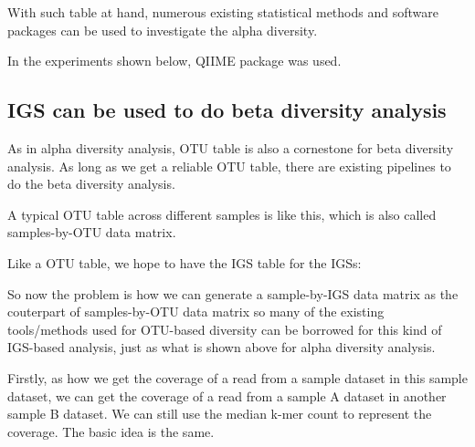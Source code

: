 \documentclass{article}
\begin{document}
With such table at hand, numerous existing statistical methods and software packages can be used to investigate the alpha diversity.  

In the experiments shown below, QIIME package was used. 




\subsection{IGS can be used to do beta diversity analysis}

As in alpha diversity analysis, OTU table is also a cornestone for beta diversity analysis. As long as we get a reliable OTU table, there are existing pipelines to do the beta diversity analysis. 

A typical OTU table across different samples is like this, which is also called samples-by-OTU data matrix.


    
Like a OTU table, we hope to have the IGS table for the IGSs:


    
    So now the problem is how we can generate a sample-by-IGS data matrix as the couterpart of samples-by-OTU data matrix so many of  the existing tools/methods used for OTU-based diversity can be borrowed for this kind of IGS-based analysis, just as what is shown above for alpha diversity analysis.

Firstly, as how we get the coverage of a read from a sample dataset in this sample dataset, we can get the coverage of a read from a sample A dataset in another sample B dataset. We can still use the median k-mer count to represent the coverage. The basic idea is the same. 

\end{document}
